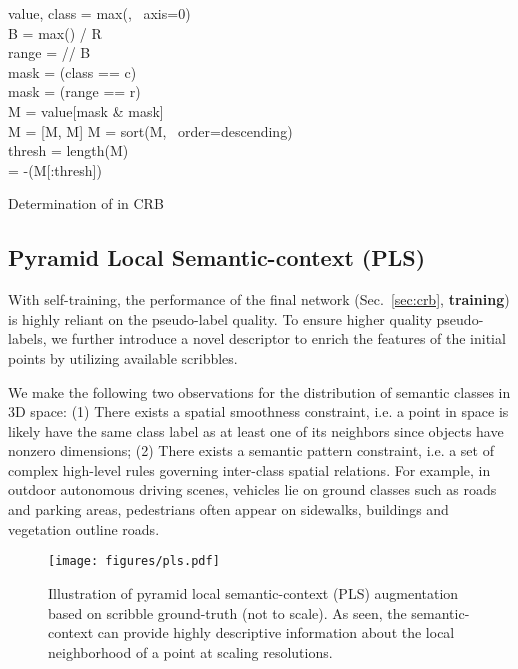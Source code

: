 \documentclass[10pt,twocolumn,letterpaper]{article}
\begin{document}
\begin{algorithm}[t]
\DontPrintSemicolon

\For{} {
    value, class = max(, \ axis=0) \\
    B = max() / R \\
    range =  // B \\
    \For{} {
        mask = (class == c) \\
        \For{} {
            mask = (range == r) \\
            M = value[mask \& mask] \\
            M = [M, M]
        }
    }
}
\For{} {
    \For{} {
        M = sort(M, \ order=descending) \\
        thresh =  length(M) \\
         = -(M[:thresh])
    }
}
\KwOutput{}
\caption{Determination of  in CRB}
\label{alg:cbr}
\end{algorithm}

\subsection{Pyramid Local Semantic-context (PLS)} \label{sec:pls}

With self-training, the performance of the final network (Sec.~\ref{sec:crb}, \textbf{training}) is highly reliant on the pseudo-label quality. To ensure higher quality pseudo-labels, we further introduce a novel descriptor to enrich the features of the initial points by utilizing available scribbles.

We make the following two observations for the distribution of semantic classes in 3D space: (1) There exists a spatial smoothness constraint, i.e. a point in space is likely have the same class label as at least one of its neighbors since objects have nonzero dimensions; (2) There exists a semantic pattern constraint, i.e. a set of complex high-level rules governing inter-class spatial relations. For example, in outdoor autonomous driving scenes, vehicles lie on ground classes such as roads and parking areas, pedestrians often appear on sidewalks, buildings and vegetation outline roads.

\begin{figure}[t]
    \centering
    \texttt{[image: figures/pls.pdf]}
    \caption{Illustration of pyramid local semantic-context (PLS) augmentation based on scribble ground-truth (not to scale). As seen, the semantic-context can provide highly descriptive information about the local neighborhood of a point at scaling resolutions.}
    \label{fig:pls}
\end{figure}
\end{document}
